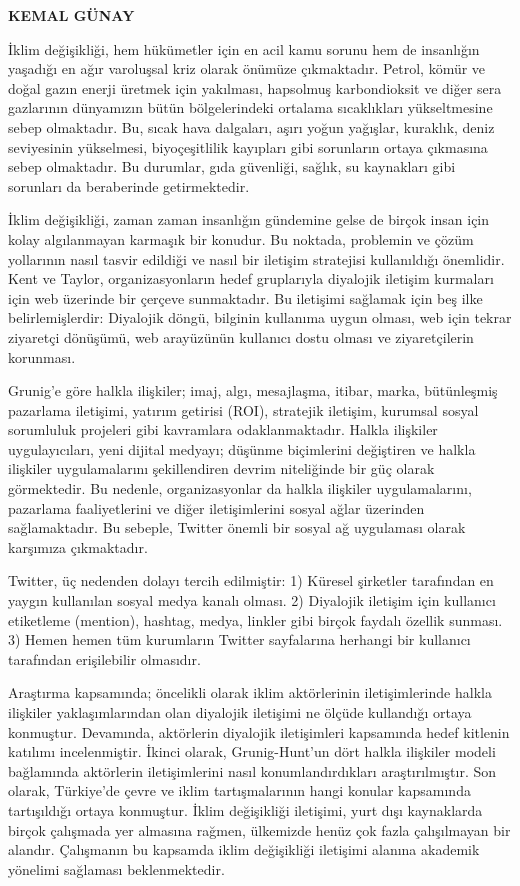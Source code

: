 \documentclass[
]{book}
\begin{document}
\textbf{KEMAL GÜNAY}

İklim değişikliği, hem hükümetler için en acil kamu sorunu hem de insanlığın yaşadığı en ağır varoluşsal kriz olarak önümüze çıkmaktadır. Petrol, kömür ve doğal gazın enerji üretmek için yakılması, hapsolmuş karbondioksit ve diğer sera gazlarının dünyamızın bütün bölgelerindeki ortalama sıcaklıkları yükseltmesine sebep olmaktadır. Bu, sıcak hava dalgaları, aşırı yoğun yağışlar, kuraklık, deniz seviyesinin yükselmesi, biyoçeşitlilik kayıpları gibi sorunların ortaya çıkmasına sebep olmaktadır. Bu durumlar, gıda güvenliği, sağlık, su kaynakları gibi sorunları da beraberinde getirmektedir.

İklim değişikliği, zaman zaman insanlığın gündemine gelse de birçok insan için kolay algılanmayan karmaşık bir konudur. Bu noktada, problemin ve çözüm yollarının nasıl tasvir edildiği ve nasıl bir iletişim stratejisi kullanıldığı önemlidir. Kent ve Taylor, organizasyonların hedef gruplarıyla diyalojik iletişim kurmaları için web üzerinde bir çerçeve sunmaktadır. Bu iletişimi sağlamak için beş ilke belirlemişlerdir: Diyalojik döngü, bilginin kullanıma uygun olması, web için tekrar ziyaretçi dönüşümü, web arayüzünün kullanıcı dostu olması ve ziyaretçilerin korunması.

Grunig'e göre halkla ilişkiler; imaj, algı, mesajlaşma, itibar, marka, bütünleşmiş pazarlama iletişimi, yatırım getirisi (ROI), stratejik iletişim, kurumsal sosyal sorumluluk projeleri gibi kavramlara odaklanmaktadır. Halkla ilişkiler uygulayıcıları, yeni dijital medyayı; düşünme biçimlerini değiştiren ve halkla ilişkiler uygulamalarını şekillendiren devrim niteliğinde bir güç olarak görmektedir. Bu nedenle, organizasyonlar da halkla ilişkiler uygulamalarını, pazarlama faaliyetlerini ve diğer iletişimlerini sosyal ağlar üzerinden sağlamaktadır. Bu sebeple, Twitter önemli bir sosyal ağ uygulaması olarak karşımıza çıkmaktadır.

Twitter, üç nedenden dolayı tercih edilmiştir: 1) Küresel şirketler tarafından en yaygın kullanılan sosyal medya kanalı olması. 2) Diyalojik iletişim için kullanıcı etiketleme (mention), hashtag, medya, linkler gibi birçok faydalı özellik sunması. 3) Hemen hemen tüm kurumların Twitter sayfalarına herhangi bir kullanıcı tarafından erişilebilir olmasıdır.

Araştırma kapsamında; öncelikli olarak iklim aktörlerinin iletişimlerinde halkla ilişkiler yaklaşımlarından olan diyalojik iletişimi ne ölçüde kullandığı ortaya konmuştur. Devamında, aktörlerin diyalojik iletişimleri kapsamında hedef kitlenin katılımı incelenmiştir. İkinci olarak, Grunig-Hunt'un dört halkla ilişkiler modeli bağlamında aktörlerin iletişimlerini nasıl konumlandırdıkları araştırılmıştır. Son olarak, Türkiye'de çevre ve iklim tartışmalarının hangi konular kapsamında tartışıldığı ortaya konmuştur. İklim değişikliği iletişimi, yurt dışı kaynaklarda birçok çalışmada yer almasına rağmen, ülkemizde henüz çok fazla çalışılmayan bir alandır. Çalışmanın bu kapsamda iklim değişikliği iletişimi alanına akademik yönelimi sağlaması beklenmektedir.
\end{document}
